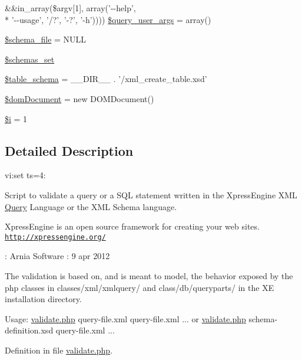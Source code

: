 \begin{DoxyCompactItemize}
$$\&\&in\+\_\+array(\$argv\mbox{[}1\mbox{]}, array('-\/-\/help', \\*
'-\/-\/usage', '/?', '-\/?', '-\/h')))) \hyperlink{validate_8php_a71edb70aa44d79c211ac52816d93b852}{\$query\+\_\+user\+\_\+args} = array()
\item 
\hyperlink{validate_8php_a72d6f00099d1020a9938b75d78d31db3}{\$schema\+\_\+file} = N\+U\+L\+L
\item 
\hyperlink{validate_8php_afdc62b6a8a4984ca9a53a1431233ed9a}{\$schemas\+\_\+set}
\item 
\hyperlink{validate_8php_ab7d4a5db53db0f967ab81c779a5b0ccb}{\$table\+\_\+schema} = \+\_\+\+\_\+\+D\+I\+R\+\_\+\+\_\+ . '/xml\+\_\+create\+\_\+table.\+xsd'
\item 
\hyperlink{validate_8php_a95b15eb9cb20bddf2214b8996fad3158}{\$dom\+Document} = new D\+O\+M\+Document()
\item 
\hyperlink{validate_8php_a83018d9153d17d91fbcf3bc10158d34f}{\$i} = 1
\end{DoxyCompactItemize}


\subsection{Detailed Description}
vi\+:set ts=4\+:

Script to validate a query or a S\+Q\+L statement written in the Xpress\+Engine X\+M\+L \hyperlink{classQuery}{Query} Language or the X\+M\+L Schema language.

Xpress\+Engine is an open source framework for creating your web sites. \href{http://xpressengine.org/}{\tt http\+://xpressengine.\+org/}

\+: Arnia Software \+: 9 apr 2012

The validation is based on, and is meant to model, the behavior exposed by the php classes in classes/xml/xmlquery/ and class/db/queryparts/ in the X\+E installation directory.

Usage\+: \hyperlink{validate_8php}{validate.\+php} query-\/file.\+xml query-\/file.\+xml ... or \hyperlink{validate_8php}{validate.\+php} schema-\/definition.\+xsd query-\/file.\+xml ... 

Definition in file \hyperlink{validate_8php_source}{validate.\+php}.



